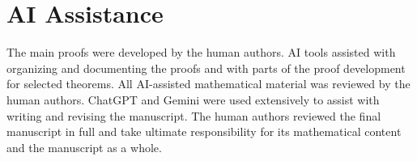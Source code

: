 \documentclass[11pt,letterpaper]{article}
\numberwithin{equation}{section}
\begin{document}

\begingroup
{}

\endgroup


\section*{AI Assistance}

The main proofs were developed by the human authors.
AI tools assisted with organizing and documenting the proofs and with parts of the proof development for selected theorems.
All AI-assisted mathematical material was reviewed by the human authors.
ChatGPT and Gemini were used extensively to assist with writing and revising the manuscript.
The human authors reviewed the final manuscript in full and take ultimate responsibility for its mathematical content and the manuscript as a whole.
\end{document}
